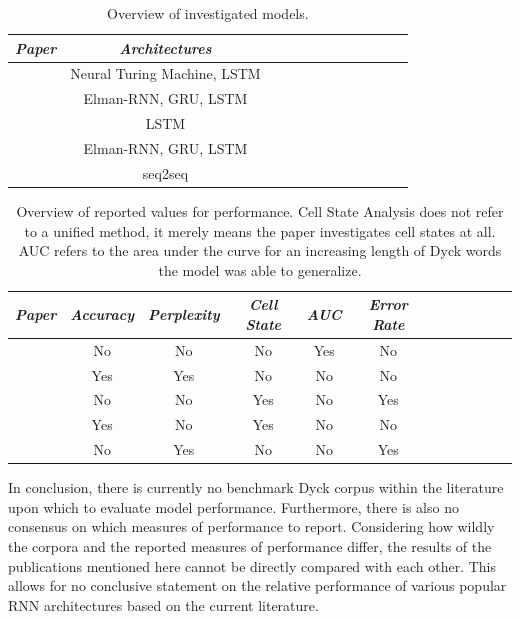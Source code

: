 \begin{table}
	\begin{tabularx}{\textwidth}{@{}l*{10}{C}c@{}}
	\toprule 
	\textit{Paper} & \textit{Architectures}\\
	\toprule 
	\cite{Deleu2016} & Neural Turing Machine, LSTM\\
	\cite{Skachkova2018} & Elman-RNN, GRU, LSTM\\
	\cite{Sennhauser2018} & LSTM\\
	\cite{Suzgun2019} & Elman-RNN, GRU, LSTM\\
	\cite{Yu2019} & seq2seq\\ 
	\bottomrule
	\end{tabularx}
	\caption[Overview of investigated models]{Overview of investigated models.}
	\label{tab:LiteratureInvestigatedModels}
\end{table} 

\begin{table}
	\begin{tabularx}{\textwidth}{@{}l*{10}{C}c@{}}
	\toprule 
	\textit{Paper} & \textit{Accuracy} & \textit{Perplexity} & \textit{Cell State} & \textit{AUC} & \textit{Error Rate} \\
	\toprule
	\cite{Deleu2016} & No & No & No & Yes & No \\
	\cite{Skachkova2018} & Yes & Yes & No & No & No \\
	\cite{Sennhauser2018} & No & No & Yes & No & Yes \\
	\cite{Suzgun2019} & Yes & No & Yes & No & No\\
	\cite{Yu2019} & No & Yes & No & No & Yes \\ 
	\bottomrule
	\end{tabularx} 
	\caption[Overview of reported values for performance]{Overview of reported values for performance. Cell State Analysis does not refer to a unified method, it merely means the paper investigates cell states at all. AUC refers to the area under the curve for an increasing length of Dyck words the model was able to generalize.}
	\label{tab:LiteratureReportedMeasures}
\end{table} 

In conclusion, there is currently no benchmark Dyck corpus within the literature upon which to evaluate model performance. Furthermore, there is also no consensus on which measures of performance to report. Considering how wildly the corpora and the reported measures of performance differ, the results of the publications mentioned here cannot be directly compared with each other. This allows for no conclusive statement on the relative performance of various popular RNN architectures based on the current literature.
